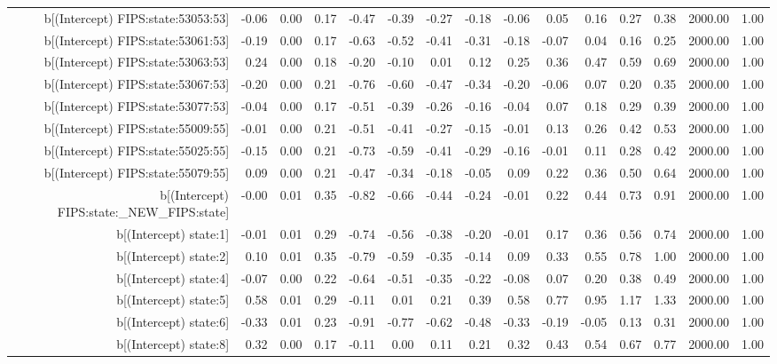 \begin{table}[ht]
\begin{tabular}{rrrrrrrrrrrrrrr}
  b[(Intercept) FIPS:state:53053:53] & -0.06 & 0.00 & 0.17 & -0.47 & -0.39 & -0.27 & -0.18 & -0.06 & 0.05 & 0.16 & 0.27 & 0.38 & 2000.00 & 1.00 \\ 
  b[(Intercept) FIPS:state:53061:53] & -0.19 & 0.00 & 0.17 & -0.63 & -0.52 & -0.41 & -0.31 & -0.18 & -0.07 & 0.04 & 0.16 & 0.25 & 2000.00 & 1.00 \\ 
  b[(Intercept) FIPS:state:53063:53] & 0.24 & 0.00 & 0.18 & -0.20 & -0.10 & 0.01 & 0.12 & 0.25 & 0.36 & 0.47 & 0.59 & 0.69 & 2000.00 & 1.00 \\ 
  b[(Intercept) FIPS:state:53067:53] & -0.20 & 0.00 & 0.21 & -0.76 & -0.60 & -0.47 & -0.34 & -0.20 & -0.06 & 0.07 & 0.20 & 0.35 & 2000.00 & 1.00 \\ 
  b[(Intercept) FIPS:state:53077:53] & -0.04 & 0.00 & 0.17 & -0.51 & -0.39 & -0.26 & -0.16 & -0.04 & 0.07 & 0.18 & 0.29 & 0.39 & 2000.00 & 1.00 \\ 
  b[(Intercept) FIPS:state:55009:55] & -0.01 & 0.00 & 0.21 & -0.51 & -0.41 & -0.27 & -0.15 & -0.01 & 0.13 & 0.26 & 0.42 & 0.53 & 2000.00 & 1.00 \\ 
  b[(Intercept) FIPS:state:55025:55] & -0.15 & 0.00 & 0.21 & -0.73 & -0.59 & -0.41 & -0.29 & -0.16 & -0.01 & 0.11 & 0.28 & 0.42 & 2000.00 & 1.00 \\ 
  b[(Intercept) FIPS:state:55079:55] & 0.09 & 0.00 & 0.21 & -0.47 & -0.34 & -0.18 & -0.05 & 0.09 & 0.22 & 0.36 & 0.50 & 0.64 & 2000.00 & 1.00 \\ 
  b[(Intercept) FIPS:state:\_NEW\_FIPS:state] & -0.00 & 0.01 & 0.35 & -0.82 & -0.66 & -0.44 & -0.24 & -0.01 & 0.22 & 0.44 & 0.73 & 0.91 & 2000.00 & 1.00 \\ 
  b[(Intercept) state:1] & -0.01 & 0.01 & 0.29 & -0.74 & -0.56 & -0.38 & -0.20 & -0.01 & 0.17 & 0.36 & 0.56 & 0.74 & 2000.00 & 1.00 \\ 
  b[(Intercept) state:2] & 0.10 & 0.01 & 0.35 & -0.79 & -0.59 & -0.35 & -0.14 & 0.09 & 0.33 & 0.55 & 0.78 & 1.00 & 2000.00 & 1.00 \\ 
  b[(Intercept) state:4] & -0.07 & 0.00 & 0.22 & -0.64 & -0.51 & -0.35 & -0.22 & -0.08 & 0.07 & 0.20 & 0.38 & 0.49 & 2000.00 & 1.00 \\ 
  b[(Intercept) state:5] & 0.58 & 0.01 & 0.29 & -0.11 & 0.01 & 0.21 & 0.39 & 0.58 & 0.77 & 0.95 & 1.17 & 1.33 & 2000.00 & 1.00 \\ 
  b[(Intercept) state:6] & -0.33 & 0.01 & 0.23 & -0.91 & -0.77 & -0.62 & -0.48 & -0.33 & -0.19 & -0.05 & 0.13 & 0.31 & 2000.00 & 1.00 \\ 
  b[(Intercept) state:8] & 0.32 & 0.00 & 0.17 & -0.11 & 0.00 & 0.11 & 0.21 & 0.32 & 0.43 & 0.54 & 0.67 & 0.77 & 2000.00 & 1.00 \\ 

\end{tabular}
\end{table}
